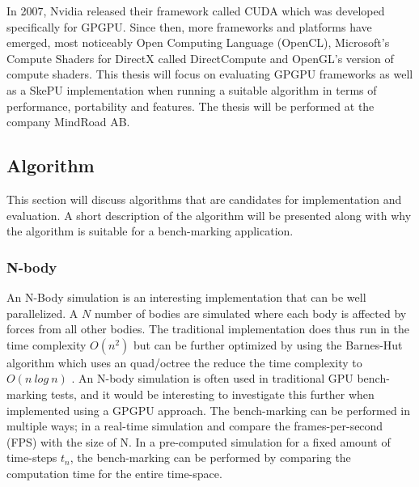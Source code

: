 \documentclass{article}
\begin{document}
In 2007, Nvidia released their framework called CUDA which was developed specifically for GPGPU. Since then, more frameworks and platforms have emerged, most noticeably Open Computing Language (OpenCL), Microsoft's Compute Shaders for DirectX called DirectCompute and OpenGL's version of compute shaders. This thesis will focus on evaluating GPGPU frameworks as well as a SkePU implementation when running a suitable algorithm in terms of performance, portability and features. The thesis will be performed at the company MindRoad AB.

\subsection{Algorithm} \label{subsec:algorithm}
This section will discuss algorithms that are candidates for implementation and evaluation. A short description of the algorithm will be presented along with why the algorithm is suitable for a bench-marking application.

\subsubsection{N-body}
An N-Body simulation is an interesting implementation that can be well parallelized. A $N$ number of bodies are simulated where each body is affected by forces from all other bodies. The traditional implementation does thus run in the time complexity $O(n^2)$ but can be further optimized by using the Barnes-Hut algorithm which uses an quad/octree the reduce the time complexity to $O(n \ log \ n)$ \cite{barnes1986hierarchical}. An N-body simulation is often used in traditional GPU bench-marking tests, and it would be interesting to investigate this further when implemented using a GPGPU approach. The bench-marking can be performed in multiple ways; in a real-time simulation and compare the frames-per-second (FPS) with the size of N. In a pre-computed simulation for a fixed amount of time-steps $t_n$, the bench-marking can be performed by comparing the computation time for the entire time-space.
\end{document}
